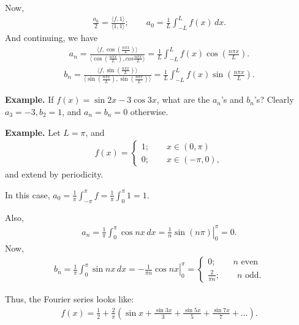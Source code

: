 \documentclass{article}
\begin{document}
Now,
\begin{align*}
  \frac{a_0}{2} = \frac{\langle f, 1\rangle}{\langle 1, 1\rangle}; \qquad a_0 = \frac{1}{L} \int_{-L}^{L} f(x) \, dx.
\end{align*}
And continuing, we have
\begin{align*}
  a_n = \frac{\langle f, \cos \left( \frac{n \pi x}{L} \right)\rangle}{\langle \cos \left( \frac{n \pi x}{L} \right), cos \frac{n \pi x}{L}\rangle} = \frac{1}{L} \int_{-L}^{L} f(x) \cos \left( \frac{n \pi x}{L} \right).
\end{align*}
\begin{align*}
  b_n = \frac{\langle f, \sin \left( \frac{n \pi x}{L} \right)\rangle}{\langle \sin \left( \frac{n \pi x}{L} \right), \sin \left( \frac{n \pi x}{L} \right)\rangle} = \frac{1}{L} \int_{-L}^{L} f(x) \sin \left( \frac{n \pi x}{L} \right).
\end{align*}

{\bf Example.} If $f(x) = \sin 2x - 3 \cos 3 x$, what are the $a_n$'s and $b_n$'s?  Clearly $a_3 = -3, b_2 = 1$, and $a_n = b_n = 0$ otherwise.

{\bf Example.} Let $L = \pi$, and 
\begin{align*}
  f(x) = 
  \begin{cases}
    1; \qquad x \in (0, \pi) \\
    0; \qquad x \in (-\pi, 0),
  \end{cases}
\end{align*}
and extend by periodicity.

In this case, $a_0 = \frac{1}{\pi} \int_{- \pi}^{\pi} f = \frac{1}{\pi} \int_{0}^{\pi} 1 = 1$.

Also,
\begin{align*}
  a_n = \frac{1}{\pi} \int_{0}^{\pi}  \cos nx \, dx = \left . \frac{1}{n} \sin (n \pi) \right |_{0}^{\pi} = 0.
\end{align*}
Now,
\begin{align*}
  b_n = \frac{1}{\pi} \int_{0}^{\pi} \sin nx \, dx = \left . - \frac{1}{\pi n} \cos nx \right |_{0}^{\pi} = 
  \begin{cases}
    0; \qquad n \text{ even } \\
    \frac{2}{\pi n}; \qquad n \text{ odd}.
  \end{cases}
\end{align*}

Thus, the Fourier series looks like:
\begin{align*}
  f(x) = \frac{1}{2} + \frac{2}{\pi} \left( \sin x + \frac{\sin 3x}{3} + \frac{\sin 5x}{5} + \frac{\sin 7x}{7} + \dots \right).
\end{align*}
\end{document}
